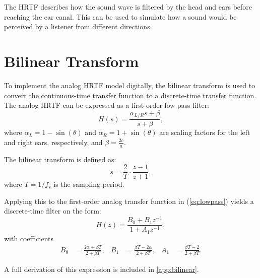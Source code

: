 The HRTF describes how the sound wave is filtered by the head and ears before reaching the ear canal. This can be used to simulate how a sound would be perceived by a listener from different directions.


\section{Bilinear Transform}

To implement the analog HRTF model digitally, the bilinear transform is used to convert the continuous-time transfer function to a discrete-time transfer function. The analog HRTF can be expressed as a first-order low-pass filter:
\begin{equation}
  H(s) = \frac{\alpha_{L/R} s + \beta}{s + \beta},
  \label{eq:lowpass}
\end{equation}
where \( \alpha_L = 1 - \sin(\theta) \) and \( \alpha_R = 1 + \sin(\theta) \) are scaling factors
for the left and right ears, respectively, and \( \beta = \frac{2c}{a} \).

The bilinear transform \cite{BilinearTransform} is defined as:
\begin{equation}
  s = \frac{2}{T} \cdot \frac{z-1}{z+1},
\end{equation}
where \( T = 1/f_s \) is the sampling period.

Applying this to the first-order analog transfer function in (\autoref{eq:lowpass}) yields a discrete-time filter on the form:
\begin{equation}
  H(z) = \frac{B_0 + B_1 z^{-1}}{1 + A_1 z^{-1}},
\end{equation}
with coefficients
\begin{align}
  B_0 &= \frac{2\alpha + \beta T}{2 + \beta T}, &
  B_1 &= \frac{\beta T - 2\alpha}{2 + \beta T}, &
  A_1 &= \frac{\beta T - 2}{2 + \beta T}.
\end{align}

A full derivation of this expression is included in \autoref{app:bilinear}.